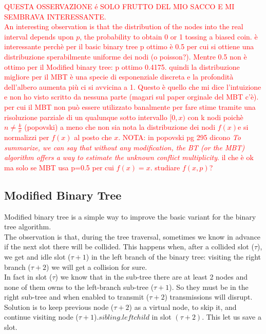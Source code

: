 \documentclass[12pt,a4paper]{report}
\begin{document}
\textcolor{red}{QUESTA OSSERVAZIONE é SOLO FRUTTO DEL MIO SACCO E MI SEMBRAVA INTERESSANTE.\\
An interesting observation is that the distribution of the nodes into the real interval depends upon $p$, the probability  to obtain 0 or 1 tossing a biased coin.
è interessante perchè per il basic binary tree p ottimo è 0.5 per cui si ottiene una distribuzione sperabilmente uniforme dei nodi (o poisson?). Mentre 0.5 non è ottimo per il Modified binary tree: p ottimo 0.4175. quindi la distribuzione migliore per il MBT è una specie di esponenziale discreta e la profondità dell'albero aumenta più ci si avvicina a 1. Questo è quello che mi dice l'intuizione e non ho visto scritto da nessuna parte (magari sul paper orginale del MBT c'è). per cui il MBT non può essere utilizzato banalmente per fare stime tramite una risoluzione parziale di un qualunque sotto intervallo $[0,x)$ con k nodi poichè $n \neq \frac{k}{x} $ (popovski) a meno che non sia nota la distribuzione dei nodi $f(x) $e si normalizzi per $f(x)$ al posto che $x$. 
NOTA: in popovski pg 295  dicono \emph{To summarize, we can say that without any modification, the BT (or the MBT) algorithm offers a way to estimate the unknown conflict multiplicity}. il che è ok ma solo se MBT usa p=0.5
per cui $f(x)=x$. studiare $f(x,p)$?}
\subsection{Modified Binary Tree}

Modified binary tree is a simple way to improve the basic variant for the binary tree algorithm.\\ The observation is that, during the tree traversal, sometimes we know in advance if the next slot there will be collided. This happens when, after a collided slot ($\tau$), we get and idle slot ($\tau+1$) in the left branch of the binary tree: visiting the right branch ($\tau+2$) we will get a collision for sure.\\
In fact in slot ($\tau$) we know that in the sub-tree there are at least 2 nodes and none of them owns to the left-branch sub-tree ($\tau+1$). So they must be in the right sub-tree and when enabled to transmit ($\tau+2$) transmissions will disrupt.
Solution is to keep previous node ($\tau+2$) as a virtual node, to skip it, and continue visiting node ($\tau+1$).$sibling$.$leftchild$ in slot $(\tau+2)$.
This let us save a slot.\\
\end{document}
